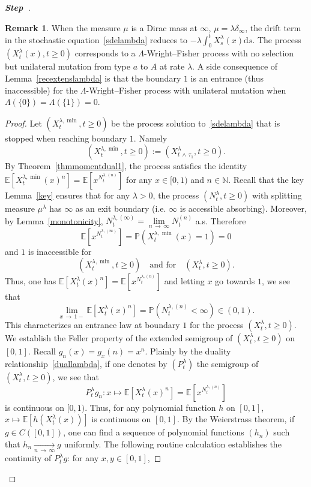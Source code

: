 \documentclass[10pt]{amsart}
\theoremstyle{definition}\newtheorem{defi}[theo]{Definition}\newtheorem{rema}[theo]{Remark}\newtheorem{exam}[theo]{Example}\newtheorem{exem}[theo]{Example}\newtheorem{nota}[theo]{Notation}
\newcommand{\ddr}{\mathrm{d}}
\newcommand{\bbN}{\mathbb{N}}
\newcommand{\bbE}{\mathbb{E}}
\newcommand{\bbP}{\mathbb{P}}
\newcounter{stepcount}
\newenvironment{step}{\refstepcounter{stepcount}\begin{proof}[\textbf{Step~\thestepcount}]}{\end{proof}}
\begin{document}
\begin{step}
\begin{rema}
When the measure $\mu$ is a Dirac mass at $\infty$, $\mu=\lambda\delta_{\infty}$, the drift term in the stochastic equation~\eqref{sdelambda} reduces to $-\lambda\int_{0}^{t}X_s^{\lambda}(x)\ddr s$. The process $(X_t^{\lambda}(x),t\geq 0)$ corresponds to a $\Lambda$-Wright--Fisher process with no selection but unilateral mutation from type $a$ to $A$ at rate $\lambda$. A side consequence of Lemma~\ref{recextenslambda} is that the boundary $1$ is an entrance (thus inaccessible) for the $\Lambda$-Wright--Fisher process with unilateral mutation when $\Lambda(\{0\})=\Lambda(\{1\})=0$.
\end{rema}

\begin{proof}
Let $(X_t^{\lambda,\min},t\geq 0)$ be the process solution to~\eqref{sdelambda} that is stopped when reaching boundary $1$. Namely 
\[
\left(X_t^{\lambda,\min},t\geq 0\right):=\left(X_{t\,\wedge\,\tau_1}^{\lambda},t\geq 0\right).
\]
By Theorem~\ref{thmmomentdual1}, the process satisfies the identity $\bbE[X_t^{\lambda,\min }(x)^n]=\bbE[x^{N_t^{\lambda,(n)}}]$ for any $x\in [0,1)$ and $n\in \bbN$. Recall that the key Lemma~\ref{key} ensures that for any $\lambda>0$, the process $(N^{\lambda}_t,t\geq 0)$ with splitting measure $\mu^{\lambda}$ has $\infty$ as an exit boundary (i.e. $\infty$ is accessible absorbing). Moreover, by Lemma~\ref{monotonicity}, $N_t^{\lambda,(\infty)}=\underset{n\,\rightarrow\,\infty}{\lim} N_t^{(n)}$ a.s. Therefore 
\[
\bbE\left[x^{N_t^{\lambda,(\infty)}}\right]=\bbP\left(X_t^{\lambda,\min }(x)=1\right)=0
\]
and $1$ is inaccessible for
\[
\left(X_t^{\lambda,\min },t\geq 0\right)\quad \text{and for}\quad\left(X_t^{\lambda},t\geq 0\right).
\]
Thus, one has $\bbE[X^{\lambda}_t(x)^n]=\bbE[x^{N_t^{\lambda,(n)}}]$ and letting $x$ go towards $1$, we see that
\[
\underset{x\,\rightarrow\,1-}{\lim}  \bbE\left[X^{\lambda}_t(x)^n\right]=\bbP\left(N_t^{\lambda,(n)}<\infty\right)\in (0,1).
\]
This characterizes an entrance law at boundary $1$ for the process $(X_t^{\lambda},t\geq 0)$. We establish the Feller property of the extended semigroup of $(X^{\lambda}_t,t\geq 0)$ on $[0,1]$. Recall $g_n(x)=g_x(n)=x^{n}$. Plainly by the duality relationship~\eqref{duallambda}, if one denotes by $(P^{\lambda}_t)$ the semigroup of $(X_t^{\lambda},t\geq 0)$, we see that
\[
P^{\lambda}_tg_n:x\mapsto \bbE\left[X_t^{\lambda}(x)^n\right]=\bbE\left[x^{N_t^{\lambda,(n)}}\right]
\]
is continuous on $[0,1)$. Thus, for any polynomial function $h$ on $[0,1]$, $x\mapsto \bbE[h(X_t^{\lambda}(x))]$ is continuous on $[0,1]$. By the Weierstrass theorem, if $g\in C([0,1])$, one can find a sequence of polynomial functions $(h_n)$ such that $h_n\underset{n\,\rightarrow\, \infty}{\longrightarrow} g $ uniformly. The following routine calculation establishes the continuity of $P^{\lambda}_t g$: for any $x,y\in [0,1]$,

\end{proof}
\end{step}
\end{document}
